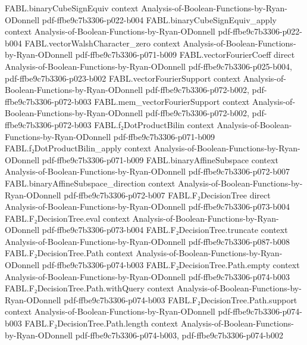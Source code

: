\begin{theorem}
\proofstep
  {FABL.binaryCubeSignEquiv}
  {context}
  {Analysis-of-Boolean-Functions-by-Ryan-ODonnell}
  {pdf-ffbe9c7b3306-p022-b004}
\proofstep
  {FABL.binaryCubeSignEquiv_apply}
  {context}
  {Analysis-of-Boolean-Functions-by-Ryan-ODonnell}
  {pdf-ffbe9c7b3306-p022-b004}
\proofstep
  {FABL.vectorWalshCharacter_zero}
  {context}
  {Analysis-of-Boolean-Functions-by-Ryan-ODonnell}
  {pdf-ffbe9c7b3306-p071-b009}
\proofstep
  {FABL.vectorFourierCoeff}
  {direct}
  {Analysis-of-Boolean-Functions-by-Ryan-ODonnell}
  {pdf-ffbe9c7b3306-p025-b004,
    pdf-ffbe9c7b3306-p023-b002}
\proofstep
  {FABL.vectorFourierSupport}
  {context}
  {Analysis-of-Boolean-Functions-by-Ryan-ODonnell}
  {pdf-ffbe9c7b3306-p072-b002,
    pdf-ffbe9c7b3306-p072-b003}
\proofstep
  {FABL.mem_vectorFourierSupport}
  {context}
  {Analysis-of-Boolean-Functions-by-Ryan-ODonnell}
  {pdf-ffbe9c7b3306-p072-b002,
    pdf-ffbe9c7b3306-p072-b003}
\proofstep
  {FABL.f₂DotProductBilin}
  {context}
  {Analysis-of-Boolean-Functions-by-Ryan-ODonnell}
  {pdf-ffbe9c7b3306-p071-b009}
\proofstep
  {FABL.f₂DotProductBilin_apply}
  {context}
  {Analysis-of-Boolean-Functions-by-Ryan-ODonnell}
  {pdf-ffbe9c7b3306-p071-b009}
\proofstep
  {FABL.binaryAffineSubspace}
  {context}
  {Analysis-of-Boolean-Functions-by-Ryan-ODonnell}
  {pdf-ffbe9c7b3306-p072-b007}
\proofstep
  {FABL.binaryAffineSubspace_direction}
  {context}
  {Analysis-of-Boolean-Functions-by-Ryan-ODonnell}
  {pdf-ffbe9c7b3306-p072-b007}
\proofstep
  {FABL.F₂DecisionTree}
  {direct}
  {Analysis-of-Boolean-Functions-by-Ryan-ODonnell}
  {pdf-ffbe9c7b3306-p073-b004}
\proofstep
  {FABL.F₂DecisionTree.eval}
  {context}
  {Analysis-of-Boolean-Functions-by-Ryan-ODonnell}
  {pdf-ffbe9c7b3306-p073-b004}
\proofstep
  {FABL.F₂DecisionTree.truncate}
  {context}
  {Analysis-of-Boolean-Functions-by-Ryan-ODonnell}
  {pdf-ffbe9c7b3306-p087-b008}
\proofstep
  {FABL.F₂DecisionTree.Path}
  {context}
  {Analysis-of-Boolean-Functions-by-Ryan-ODonnell}
  {pdf-ffbe9c7b3306-p074-b003}
\proofstep
  {FABL.F₂DecisionTree.Path.empty}
  {context}
  {Analysis-of-Boolean-Functions-by-Ryan-ODonnell}
  {pdf-ffbe9c7b3306-p074-b003}
\proofstep
  {FABL.F₂DecisionTree.Path.withQuery}
  {context}
  {Analysis-of-Boolean-Functions-by-Ryan-ODonnell}
  {pdf-ffbe9c7b3306-p074-b003}
\proofstep
  {FABL.F₂DecisionTree.Path.support}
  {context}
  {Analysis-of-Boolean-Functions-by-Ryan-ODonnell}
  {pdf-ffbe9c7b3306-p074-b003}
\proofstep
  {FABL.F₂DecisionTree.Path.length}
  {context}
  {Analysis-of-Boolean-Functions-by-Ryan-ODonnell}
  {pdf-ffbe9c7b3306-p074-b003,
    pdf-ffbe9c7b3306-p074-b002}
\proofstep

\end{theorem}
